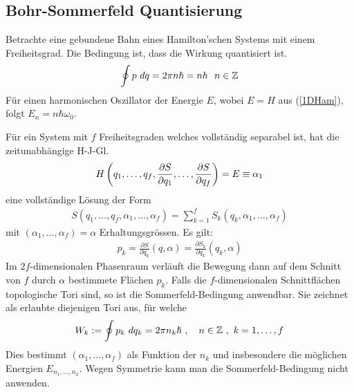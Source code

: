\subsection{Bohr-Sommerfeld Quantisierung}
Betrachte eine gebundene Bahn eines Hamilton'schen Systems mit einem
Freiheitsgrad. Die Bedingung ist, dass die Wirkung quantisiert ist.
\begin{align*}
    \oint p \ dq = 2 \pi n \hbar = n h \ \ n \in \mathbb{Z}
\end{align*}
Für einen harmonischen Oszillator der Energie $E$, wobei $E = H$ aus
(\ref{1DHam}), folgt $E_n = n \hbar \omega_0$.

Für ein System mit $f$ Freiheitsgraden welches vollständig separabel ist, hat
die zeitunabhängige H-J-Gl.
\begin{align*}
    H \left( q_1,\dots,q_f,\frac{\partial S}{\partial q_1},\dots,\frac{\partial S}{\partial q_f} \right)
    = E \equiv \alpha_1
\end{align*}
eine vollständige Lösung der Form
\begin{align*}
    S(q_1,\dots,q_f,\alpha_1,\dots,\alpha_f) = \sum_{k=1}^f S_k (q_k,\alpha_1,\dots,\alpha_f)
\end{align*}
mit $(\alpha_1,\dots,\alpha_f) = \alpha$ Erhaltungsgrössen. Es gilt:
\begin{align*}
    p_k = \frac{\partial S}{\partial q_k}(q,\alpha)
    = \frac{\partial S_k}{\partial q_k} (q_k,\alpha)
\end{align*}
Im $2f$-dimensionalen Phasenraum verläuft die Bewegung dann auf dem Schnitt
von $f$ durch $\alpha$ bestimmete Flächen $p_k$. Falls die $f$-dimensionalen
Schnittflächen topologische Tori sind, so ist die Sommerfeld-Bedingung anwendbar.
Sie zeichnet als erlaubte diejenigen Tori aus, für welche
\begin{align*}
    W_k := \oint p_k \ dq_k = 2 \pi n_k \hbar \ ,
    \hspace{10pt} n \in \mathbb{Z} \ , \ k = 1,\dots,f
\end{align*}
Dies bestimmt $(\alpha_1,\dots,\alpha_f)$ als Funktion der $n_k$ und
insbesondere die möglichen Energien $E_{n_1,\dots,n_k}$. Wegen Symmetrie
kann man die Sommerfeld-Bedingung nicht anwenden.

